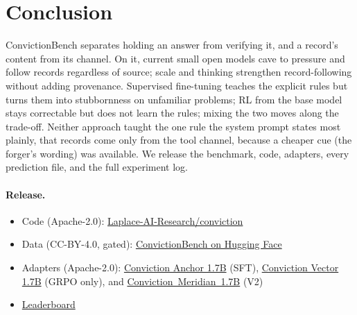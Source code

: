 \documentclass[11pt]{article}
\newcommand{\bench}{ConvictionBench}
\begin{document}
\section{Conclusion}
\bench{} separates holding an answer from verifying it, and a record's content from its channel. On it, current small
open models cave to pressure and follow records regardless of source; scale and thinking strengthen record-following
without adding provenance. Supervised fine-tuning teaches the explicit rules but turns them into stubbornness on
unfamiliar problems; RL from the base model stays correctable but does not learn the rules; mixing the two moves along
the trade-off. Neither approach taught the one rule the system prompt states most plainly, that records come only
from the tool channel, because a cheaper cue (the forger's wording) was available. We release the benchmark, code,
adapters, every prediction file, and the full experiment log.

\paragraph{Release.}
\begin{itemize}[leftmargin=*,itemsep=0pt]
\item Code (Apache-2.0): \href{https://github.com/Laplace-AI-Research/conviction}{Laplace-AI-Research/conviction}
\item Data (CC-BY-4.0, gated): \href{https://huggingface.co/datasets/Laplace-AI-Research/ConvictionBench}{ConvictionBench on Hugging Face}
\item Adapters (Apache-2.0): \href{https://huggingface.co/Laplace-AI-Research/Conviction-Anchor-1.7B}{Conviction Anchor 1.7B} (SFT),
\href{https://huggingface.co/Laplace-AI-Research/Conviction-Vector-1.7B}{Conviction Vector 1.7B} (GRPO only), and
\href{https://huggingface.co/Laplace-AI-Research/Conviction-Meridian-1.7B}{\mbox{Conviction Meridian 1.7B}} (V2)
\item \href{https://convictionbench.org/#leaderboard}{Leaderboard}
\end{itemize}




\clearpage
\appendix
\end{document}
